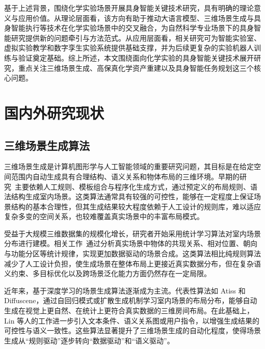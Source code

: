 基于上述背景，围绕化学实验场景开展具身智能关键技术研究，具有明确的理论意义与应用价值。从理论层面看，该方向有助于推动大语言模型、三维场景生成与具身智能执行等技术在化学实验场景中的交叉融合，为自然科学专业场景下的具身智能研究提供新的问题牵引与方法范式。从应用层面看，相关研究可为智能实验室、虚拟实验教学和数字孪生实验系统提供基础支撑，并为后续更复杂的实验机器人训练与验证奠定基础。综上所述，本文围绕面向化学实验的具身智能关键技术展开研究，重点关注三维场景生成、高保真化学资产重建以及具身智能任务规划这三个核心问题。



\section{国内外研究现状}


\subsection{三维场景生成算法}

三维场景生成是计算机图形学与人工智能领域的重要研究问题，其目标是在给定空间范围内自动生成具有合理结构、语义关系和物体布局的三维环境。早期的研究~\cite{germer2009procedural,merrell2011furniturelayout,yu2011makeithome,wonka2003instant}主要依赖人工规则、模板组合与程序化生成方式，通过预定义的布局规则、语法结构生成室内场景。这类算法通常具有较强的可控性，能够在一定程度上保证场景结构的基本合理性，但其生成结果较大程度依赖于人工设计的规则库，难以适应复杂多变的空间关系，也较难覆盖真实场景中的丰富布局模式。

受益于大规模三维数据集的规模化增长\cite{song2017sscnet,song2015sunrgbd,fu2021future,fu2021front}，研究者开始采用统计学习算法对室内场景分布进行建模。相关工作~\cite{wang2019planit,li2019grains,purkait2020sgvae,gao2023scenehgn}通过分析真实场景中物体的共现关系、相对位置、朝向与功能分区等统计规律，实现更加数据驱动的场景合成。这类算法相比纯规则算法减少了人工设计负担，使生成场景在整体布局上更接近真实数据分布，但在复杂语义约束、多目标优化以及跨场景泛化能力方面仍然存在一定局限。

近年来，基于深度学习的场景生成算法逐渐成为主流\cite{wang2021sceneformer,zhang2022fast3d,wei2023legonet,zhai2023commonscenes,yang2024physcene,paschalidou2021atiss,tang2024diffuscene,lin2024instructscene}。代表性算法如 Atiss\cite{paschalidou2021atiss} 和 Diffuscene\cite{tang2024diffuscene}，通过自回归模式或扩散生成机制学习室内场景的布局分布，能够自动生成在视觉上更自然、在统计上更符合真实数据的三维房间布局。在此基础上，Lin 等人的工作\cite{lin2024instructscene}进一步引入文本条件、语义关系图或用户指令，以增强生成结果的可控性与语义一致性。这些算法显著提升了三维场景生成的自动化程度，使得场景生成从“规则驱动”逐步转向“数据驱动”和“语义驱动”。

